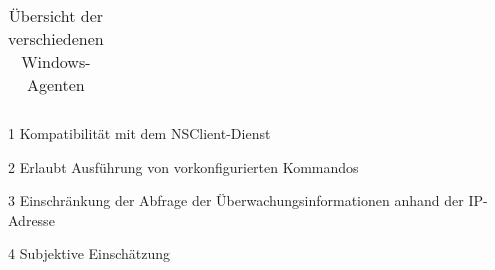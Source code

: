 \begin{table}[!cht]
\begin{threeparttable}
\begin{tabular}{l p{1.3cm} l p{1.3cm} l p{1.3cm} l p{1.3cm} l p{1.3cm} l p{1.3cm} p{1.3cm} p{1.3cm} p{1.3cm} p{1.3cm}}
\end{tabular}
\begin{tablenotes}\footnotesize
		\item[1] Kompatibilität mit dem NSClient-Dienst
		\item[2] Erlaubt Ausführung von vorkonfigurierten Kommandos
        \item[3] Einschränkung der Abfrage der Überwachungsinformationen anhand der \gls{IP}-Adresse
        \item[4] Subjektive Einschätzung
    \end{tablenotes}
\caption{Übersicht der verschiedenen Windows-Agenten}
\label{tab:winagents}
\end{threeparttable}
\end{table}
